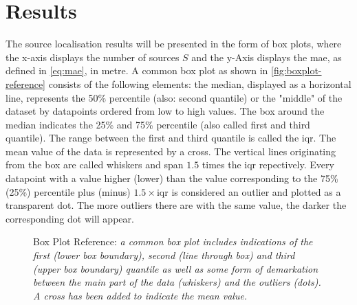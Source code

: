 \setcounter{topnumber}{2}
\setcounter{bottomnumber}{2}
\setcounter{totalnumber}{4}
\renewcommand{\topfraction}{0.85}
\renewcommand{\bottomfraction}{0.85}
\renewcommand{\textfraction}{0.15}
\renewcommand{\floatpagefraction}{0.8}
\renewcommand{\textfraction}{0.1}

\setlength\figureheight{7cm}
\setlength\figurewidth{\textwidth}

\section{Results}
\label{chap:results}

The source localisation results will be presented in the form of box plots, where the x-axis displays the number of sources $S$ and the y-Axis displays the \gls{mae}, as defined in \eqref{eq:mae}, in metre. A common box plot as shown in \autoref{fig:boxplot-reference} consists of the following elements: the median, displayed as a horizontal line, represents the 50\% percentile (also: second quantile) or the "middle" of the dataset by datapoints ordered from low to high values. The box around the median indicates the 25\% and 75\% percentile (also called first and third quantile). The range between the first and third quantile is called the \gls{iqr}. The mean value of the data is represented by a cross. The vertical lines originating from the box are called whiskers and span $1.5$ times the \gls{iqr} repectively. Every datapoint with a value higher (lower) than the value corresponding to the 75\% (25\%) percentile plus (minus) $1.5\times$\gls{iqr} is considered an outlier and plotted as a transparent dot. The more outliers there are with the same value, the darker the corresponding dot will appear.

\begin{figure}[!bht]
	\setlength\figurewidth{5cm}
	\iftoggle{quick}{%
		\texttt{[image: plots/boxplots/boxplot-reference-sc]}
	}{%
		
	}
	\caption[Box Plot Reference]{Box Plot Reference: \itshape a common box plot includes indications of the first (lower box boundary), second (line through box) and third (upper box boundary) quantile as well as some form of demarkation between the main part of the data (whiskers) and the outliers (dots). A cross has been added to indicate the mean value.}
	\label{fig:boxplot-reference}
\end{figure}




